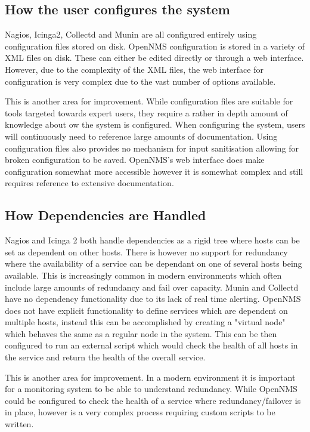 \documentclass[bsc,deptreport,twoside,parskip,singlespacing,notimes]{infthesis}
\begin{document}
\subsection{How the user configures the system}

	Nagios, Icinga2, Collectd and Munin are all configured entirely using
	configuration files stored on disk. OpenNMS configuration is stored in a
	variety of XML files on disk.  These can either be edited directly or through
	a web interface.  However, due to the complexity of the XML files, the web
	interface for configuration is very complex due to the vast number of options
	available.


	This is another area for improvement. While configuration files are suitable
	for tools targeted towards expert users, they require a rather in depth amount
	of knowledge about ow the system is configured.  When configuring the system,
	users will continuously need to reference large amounts of documentation. Using
	configuration files also provides no mechanism for input sanitisation allowing
	for broken configuration to be saved. OpenNMS's web interface does make
	configuration somewhat more accessible however it is somewhat complex and still
	requires reference to extensive documentation.
	
\subsection{How Dependencies are Handled}

	Nagios and Icinga 2 both handle dependencies as a rigid tree where hosts can
	be set as dependent on other hosts.  There is however no support for redundancy
	where the availability of a service can be dependant on one of several hosts
	being available. This is increasingly common in modern environments which often
	include large amounts of redundancy and fail over capacity. Munin and Collectd
	have no dependency functionality due to its lack of real time alerting. OpenNMS
	does not have explicit functionality to define services which are dependent on
	multiple hosts, instead this can be
	accomplished by creating a "virtual node" which behaves the same as a regular
	node in the system. This can be then configured to run an external script which
	would check the health of all hosts in the service and return the health of the
	overall service.

	This is another area for improvement. In a modern environment it is
	important for a monitoring system to be able to understand redundancy. While
	OpenNMS could be configured to check the health of a service where
	redundancy/failover is in place, however is a very complex process requiring
	custom scripts to be written.
	
\end{document}
